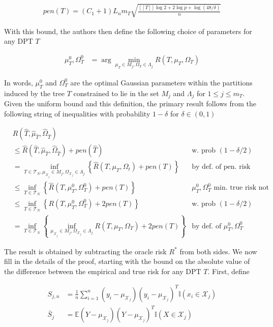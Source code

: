 \begin{align}
  pen(T) = (C_1 + 1) L_n m_T \sqrt{\frac{[[T]] \log 2 + 2 \log p + \log(48/\delta)}{n}}
\end{align}

With this bound, the authors then define the following choice of
parameters for any DPT $T$

\begin{align}
  \mu_T^0, \Omega_T^0 &= \arg\min_{\mu_T \in M_j, \Omega_T \in \Lambda_j} R(T, \mu_T, \Omega_T)
\end{align}

In words, $\mu_T^0$ and $\Omega_T^0$ are the optimal Gaussian
parameters within the partitions induced by the tree $T$ constrained
to lie in the set $M_j$ and $\Lambda_j$ for $1 \le j \le m_T$. Given
the uniform bound and this definition, the primary result follows from
the following string of inequalities with probability $1-\delta$ for
$\delta \in (0, 1)$

\begin{align}
  &R(\hat{T}, \hat{\mu}_{\hat{T}}, \hat{\Omega}_{\hat{T}}) & \\
  &\le \hat{R}(\hat{T}, \hat{\mu}_{\hat{T}}, \hat{\Omega}_{\hat{T}}) + pen(\hat{T}) & \text{w. prob } (1 - \delta/2) \\
  &= \inf_{T \in \mathcal{T}_N, \mu_{\mathcal{X}_j} \in M_j, \Omega_{\mathcal{X}_j} \in \Lambda_j}
  \left\{
    \hat{R}(T, \mu_T, \Omega_t) + pen(T)
  \right\} & \text{by def. of pen. risk est.} \\
  &\le \inf_{T \in \mathcal{T}_N}
  \left\{
    \hat{R}(T, \mu_T^0, \Omega_T^0) + pen(T)
  \right\} & \mu_T^0, \Omega_T^0 \text{ min. true risk not emp. risk} \\
  &\le \inf_{T \in \mathcal{T}_N}
  \left\{
    R(T, \mu_T^0, \Omega_T^0) + 2pen(T)
  \right\} & \text{w. prob } (1 - \delta/2) \\
  &= \inf_{T \in \mathcal{T}_N}
  \left\{
    \inf_{\mu_{\mathcal{X}_j} \in M_j, \Omega_{\mathcal{X}_j} \in \Lambda_j}
    R(T, \mu_T, \Omega_T) + 2pen(T)
  \right\} & \text{by def. of } \mu_T^0, \Omega_T^0
\end{align}

The result is obtained by subtracting the oracle risk $R^*$ from both
sides. We now fill in the details of the proof, starting with the
bound on the absolute value of the difference between the empirical
and true risk for any DPT $T$. First, define

\begin{align}
  S_{j,n} &= \frac{1}{n} \sum_{i=1}^n (y_i - \mu_{\mathcal{X}_j}) (y_i - \mu_{\mathcal{X}_j})^T \mathbb{I}(x_i \in \mathcal{X}_j) \\
  \bar{S}_j &= \mathbb{E} (Y - \mu_{\mathcal{X}_j}) (Y - \mu_{\mathcal{X}_j})^T \mathbb{I}(X \in \mathcal{X}_j)
\end{align}

